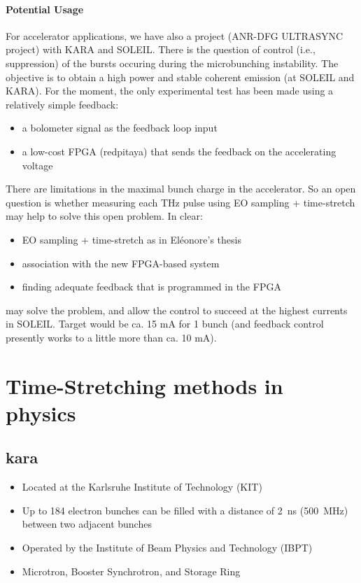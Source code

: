 \paragraph{Potential Usage}
For accelerator applications, we have also a project (ANR-DFG ULTRASYNC project) with KARA and SOLEIL.
There is the question of control (i.e., suppression) of the bursts occuring during the microbunching instability. The objective is to obtain a high power and stable coherent emission (at SOLEIL and KARA). For the moment, the only experimental test has been made using a relatively simple feedback:
\begin{itemize}
	\item a bolometer signal as the feedback loop input
	\item a low-cost FPGA (redpitaya) that sends the feedback on the accelerating voltage
\end{itemize}

There are limitations in the maximal bunch charge in the accelerator. So an open question is whether measuring each THz pulse using EO sampling + time-stretch may help to solve this open problem. In clear:

\begin{itemize}
	\item EO sampling + time-stretch as in Eléonore's thesis
	\item association with the new FPGA-based system
	\item finding adequate feedback that is programmed in the FPGA
\end{itemize}
may solve the problem, and allow the control to succeed at the highest currents in SOLEIL. 
Target would be ca. 15 mA for 1 bunch (and feedback control presently works to a little more than ca. 10 mA).


\section{Time-Stretching methods in physics}


\subsection{\gls{kara}}
	\begin{itemize}[noitemsep]
		\item Located at the Karlsruhe Institute of Technology (KIT)
		\item Up to 184 electron bunches can be filled with a distance of \SI{2}{\nano\second} (\SI{500}{\mega\hertz}) between two adjacent bunches %
		\item Operated by the Institute of Beam Physics and Technology (IBPT)
		\item Microtron, Booster Synchrotron, and Storage Ring
	\end{itemize}
	
